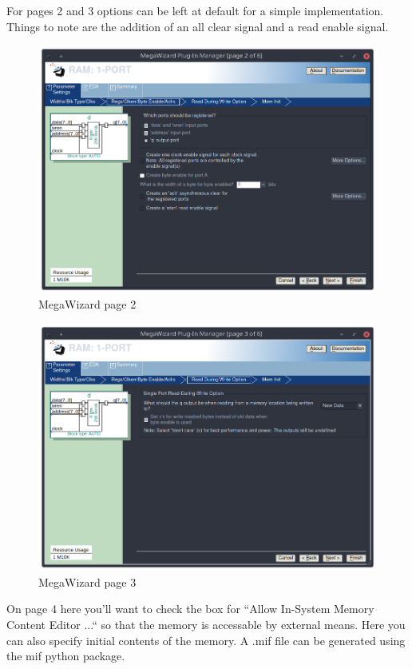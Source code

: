 \documentclass[letter,12pt]{article}
\begin{document}
For pages 2 and 3 options can be left at default for a simple implementation. Things to note are the addition of an  all clear signal and a read enable signal. 
\begin{figure}[H]
  \centering
  \includegraphics[width=.83\linewidth]{pics/Mega2.png}
  \caption{MegaWizard page 2}
\end{figure}
\begin{figure}[H]
  \centering
  \includegraphics[width=.83\linewidth]{pics/Mega3.png}
  \caption{MegaWizard page 3}
\end{figure}

On page 4 here you'll want to check the box for ``Allow In-System Memory Content Editor ...`` so that the memory is accessable by external means. Here you can also specify initial contents of the memory. A .mif file can be generated using the mif python package.
\end{document}
